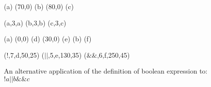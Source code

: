 




\begin {figure}
\Draw



\MarkLoc(a)
\Move(70,0)
\MarkLoc(b)
\Move(80,0)
\MarkLoc(c)

\boxItDefault(a,3,a)
\boxItDefault(b,3,b)
\boxItDefault(c,3,c)

\MoveToLoc(a)
\Move(0,0)
\MarkLoc(d)
\Move(30,0)
\MarkLoc(e)
\MoveToLoc(b)
\MarkLoc(f)

\boxIt($!$\hspace{20pt},7,d,50,25)
\boxIt(\hspace{10pt}$||$,5,e,130,35)
\boxIt(\hspace{80pt}$\&\&$\hfill,6,f,250,45)

\EndDraw

\caption {An alternative application of the definition 
of boolean expression to: 
$!a ||   b \&\& c $ 
}

\label {fig:boolExprAmb2}

\end {figure}


